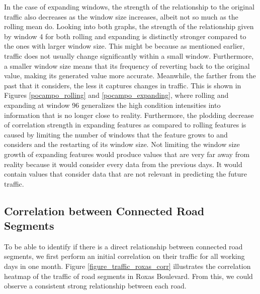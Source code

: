 In the case of expanding windows, the strength of the relationship to the original traffic also decreases as the window size increases, albeit not so much as the rolling mean do. Looking into both graphs, the strength of the relationship given by window 4 for both rolling and expanding is distinctly stronger compared to the ones with larger window size. This might be because as mentioned earlier, traffic does not usually change significantly within a small window. Furthermore, a smaller window size means that its frequency of reverting back to the original value, making its generated value more accurate. Meanwhile, the farther from the past that it considers, the less it captures changes in traffic. This is shown in Figures \ref{pocampo_rolling} and \ref{pocampo_expanding}, where rolling and expanding at window 96 generalizes the high condition intensities into information that is no longer close to reality. Furthermore, the plodding decrease of correlation strength in expanding features as compared to rolling features is caused by limiting the number of windows that the feature grows to and considers and the restarting of its window size. Not limiting the window size growth of expanding features would produce values that are very far away from reality because it would consider every data from the previous days. It would contain values that consider data that are not relevant in predicting the future traffic.




\subsection{Correlation between Connected Road Segments}
To be able to identify if there is a direct relationship between connected road segments, we first perform an initial correlation on their traffic for all working days in one month. Figure \ref{figure_traffic_roxas_corr} illustrates the correlation heatmap of the traffic of road segments in Roxas Boulevard. From this, we could observe a consistent strong relationship between each road. 



